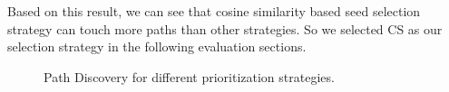 Based on this result, we can see that cosine similarity based seed selection strategy can touch more paths than other strategies. So we selected CS as our selection strategy in the following evaluation sections.
\begin{figure}
  \caption{Path Discovery for different prioritization strategies.}
  \label{path-detail}
\end{figure} 

